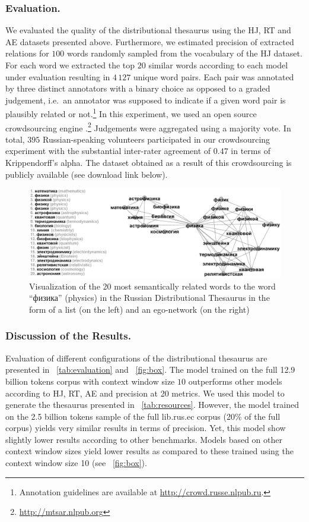 \documentclass[runningheads,a4paper]{llncs}
\begin{document}
\subsubsection{Evaluation.} We evaluated the quality of the distributional thesaurus using the  HJ, RT and AE datasets presented above. Furthermore, we estimated precision of extracted relations for $100$ words randomly sampled from the vocabulary of the HJ dataset. For each word we extracted the top $20$ similar words according to each model under evaluation resulting in $4\,127$ unique word pairs. Each pair was annotated by three distinct annotators with a binary choice as opposed to a graded judgement, i.e.\ an annotator was supposed to indicate if a given word pair is plausibly related or not.\footnote{Annotation guidelines are available at \url{http://crowd.russe.nlpub.ru}.} In this experiment, we used an open source crowdsourcing engine \cite{Ustalov:15:ispras}.\footnote{\url{http://mtsar.nlpub.org}}
Judgements were aggregated using a majority vote. In total, $395$ Russian-speaking volunteers participated in our crowdsourcing experiment with the substantial inter-rater agreement of $0.47$ in terms of Krippendorff's alpha. The dataset obtained as a result of this crowdsourcing is publicly available (see download link below). 

\begin{figure}
\centering
\includegraphics[width=1.0\textwidth]{figures/rdt-graph}
\caption{Visualization of the 20 most semantically related words to the word ``физика'' (physics) in the Russian Distributional Thesaurus in the form of a list (on the left) and an ego-network (on the right)}
\label{fig:physics}
\end{figure}

\subsubsection{Discussion of the Results.} Evaluation of different configurations of the distributional thesaurus are presented in \tablename~\ref{tab:evaluation} and \figurename~\ref{fig:box}. The model trained on the full 12.9 billion tokens corpus with context window size $10$ outperforms other models according to HJ, RT, AE and precision at 20 metrics. We used this model to generate the thesaurus presented in \tablename~\ref{tab:resources}. However, the model trained on the 2.5 billion tokens sample of the full lib.rus.ec corpus (20\% of the full corpus) yields very similar results in terms of precision. Yet, this model show slightly lower results according to other benchmarks. Models based on other context window sizes yield lower results as compared to these trained using the context window size 10 (see \figurename~\ref{fig:box}).
\end{document}
